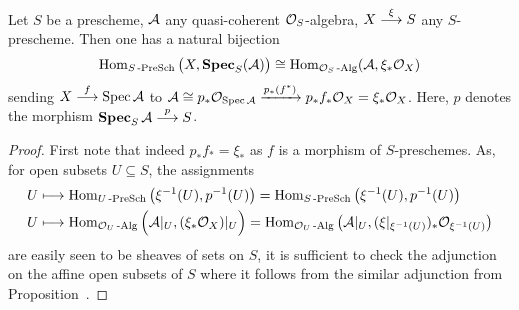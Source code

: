 \documentclass[a4paper,parskip=half,numbers=enddot, DIV=12]{scrreprt}
\begin{document}
\begin{prop}
    Let $S$ be a prescheme, $\mathcal{A}$ any quasi-coherent $\mathcal{O}_S$-algebra, $X\morphism[\xi] S$ any $S$-prescheme. Then one has a natural bijection
    \begin{align}\lbl{eq:SPECAdjunction}
        \Hom_{S\cat{-PreSch}} \big(X, \SPEC_S(\Aa)\big) \cong \Hom_{\Oo_S\cat{-Alg}} (\Aa, \xi_* \Oo_X)
    \end{align}
    sending $X\morphism[f] \Spec \Aa$ to $\mathcal{A} \cong p_* \mathcal{O}_{\operatorname{Spec} \mathcal{A}} \xrightarrow{p_*(f^*)} p_*f_* \mathcal{O}_X = \xi_* \mathcal{O}_X$. Here, $p$ denotes the morphism $\SPEC_S \Aa \morphism[p] S$.
\end{prop}
\begin{proof}
    First note that indeed $p_*f_*=\xi_*$ as $f$ is a morphism of $S$-preschemes. As, for open subsets $U\subseteq S$, the assignments
    \begin{align*}
        U&\longmapsto \operatorname{Hom}_{U\operatorname{-PreSch}} \left(\xi^{-1}(U), p^{-1}(U)\right) = \operatorname{Hom}_{S\operatorname{-PreSch}}\left(\xi^{-1}(U), p^{-1}(U)\right)\\
        U&\longmapsto \operatorname{Hom}_{\mathcal{O}_U\operatorname{-Alg}} \Big(\mathcal{A}|_U, (\xi_*\mathcal{O}_X)|_U\Big) = \operatorname{Hom}_{\mathcal{O}_U\operatorname{-Alg}}\left(\mathcal{A}|_U, (\xi|_{\xi^{-1}(U)})_* \mathcal{O}_{\xi^{-1}(U)}\right)
    \end{align*}
    are easily seen to be sheaves of sets on $S$, it is sufficient to check the adjunction  on the affine open subsets of $S$ where it follows from the similar adjunction from Proposition~.
\end{proof}
\end{document}
